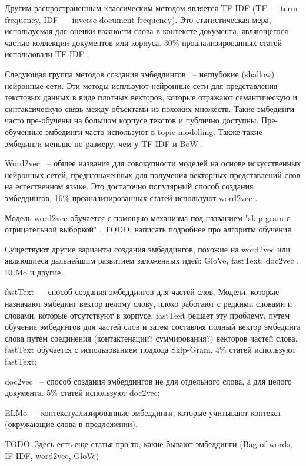 Другим распространенным классическим методом является TF-IDF (TF — term frequency, IDF — inverse document frequency). Это статистическая мера, используемая для оценки важности слова в контексте документа, являющегося частью коллекции документов или корпуса. 30\% проанализированных статей использовали TF-IDF \cite{no-patterns}.

Следующая группа методов создания эмбеддингов ~-- неглубокие (shallow) нейронные сети. Эти методы испльзуют нейронные сети для представления текстовых данных в виде плотных векторов, которые отражают семантическую и синтаксическую связь между  объектами из похожих множеств. Такие эмбединги часто пре-обучены на большом корпусе текстов и публично доступны. Пре-обученные эмбединги часто используют в  topic modelling. Также такие эмбединги меньше по размеру, чем у TF-IDF и BoW \cite{no-patterns}.

Word2vec ~-- общее название для совокупности моделей на основе искусственных нейронных сетей, предназначенных для получения векторных представлений слов на естественном языке. Это достаточно популярный способ создания эмбеддингов, 16\% проанализированных статей используют word2vec \cite{no-patterns}.

Модель word2vec обучается с помощью механизма под названием "skip-gram с отрицательной выборкой" \cite{word2vec-habr}. TODO: написать подробнее про алгоритм обучения.

Существуют другие варианты создания эмбеддингов, похожие на word2vec или являющиеся дальнейшим развитием заложенных идей: GloVe, fastText, doc2vec \cite{no-patterns}, ELMo и другие.

fastText ~-- способ создания эмбеддингов для частей слов. Модели, которые назначают эмбединг вектор целому слову, плохо работают с редкими словами  и словами, которые отсутствуют в корпусе. fastText решает эту проблему, путем обучения эмбедингов для частей слов и затем составляя полный вектор эмбединга слова путем соединения (контактенации? суммирования?) векторов частей слова. fastText обучается с использованием подхода Skip-Gram. 4\% статей \cite{no-patterns} используют fastText;

doc2vec ~-- способ создания эмбеддингов не для отдельного слова, а для целого документа. 5\% статей \cite{no-patterns} используют doc2vec;

ELMo ~-- контекстуализированные эмбеддинги, которые учитывают контекст (окружающие слова в предложении).

TODO: Здесь \cite{embeddings-habr} есть еще статья про то, какие бывают эмбеддинги (Bag of words, IF-IDF, word2vec, GloVe)

